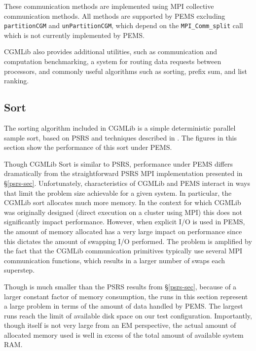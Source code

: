 \documentclass[12pt]{carletoncsthesis}
\begin{document}
These communication methods are implemented using MPI collective communication
methods.  All methods are supported by PEMS excluding {\tt partitionCGM}
and {\tt unPartitionCGM}, which depend on the {\tt MPI\_Comm\_split} call
which is not currently implemented by PEMS.

CGMLib also provides additional utilities, such as communication and computation
benchmarking, a system for routing data requests between processors, and commonly
useful algorithms such as sorting, prefix sum, and list ranking.

\subsection{Sort}

The sorting algorithm included in CGMLib is a simple deterministic
parallel sample sort, based on PSRS \cite{psrs} and techniques described
in \cite{cgmlibsort}.  The figures in this section show the performance of
this sort under PEMS.

Though CGMLib Sort is similar to PSRS, performance under PEMS differs
dramatically from the straightforward PSRS MPI implementation presented
in \S\ref{psrs-sec}.  Unfortunately, characteristics of CGMLib and PEMS
interact in ways that limit the problem size achievable for a given system.
In particular, the CGMLib sort allocates much more memory.  In the context
for which CGMLib was originally designed (direct execution on a cluster using
MPI) this does not significantly impact performance.  However, when explicit
I/O is used in PEMS, the amount of memory allocated has a very large impact
on performance since this dictates the amount of swapping I/O performed.
The problem is amplified by the fact that the CGMLib communication primitives
typically use several MPI communication functions, which results in a larger
number of swaps each superstep.

Though  is much smaller than the PSRS results from \S\ref{psrs-sec},
because of a larger constant factor of memory consumption, the runs in this
section represent a large problem in terms of the amount of data handled
by PEMS.  The largest runs reach the limit of available disk space on our
test configuration.  Importantly, though  itself is not very large from
an EM perspective, the actual amount of allocated memory used is well in
excess of the total amount of available system RAM.
\end{document}
